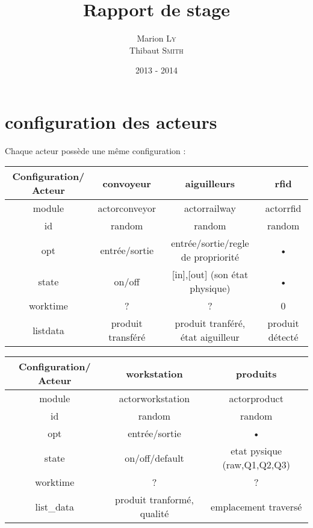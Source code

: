 

\newcommand\sectio[1]{%
  \section*{#1}%
  \addcontentsline{toc}{section}{#1}}

\renewcommand\contentsname{Sommaire}

\renewcommand{\thesection}{\arabic{section}}
\newcommand\familyname{\textsc}
\addto\captionsfrench{\renewcommand{\figurename}{Image}}

\newtoggle{annexes}
\toggletrue{annexes}



\title{\textbf{Rapport de stage}}
\author{Marion \familyname{Ly} \\ Thibaut \familyname{Smith}}
\date{2013 - 2014}


	\section{configuration des acteurs}
	
	Chaque acteur possède une même configuration :
	
	\begin{tabular}{|c|c|c|c|}
	\hline 
	Configuration/ Acteur & convoyeur & aiguilleurs & rfid  \\ 
	\hline 
	module & actorconveyor & actorrailway & actorrfid \\
	\hline 
	id & random & random & random \\
	\hline 
	opt & entrée/sortie & entrée/sortie/regle de propriorité & •  \\ 
	\hline 
	state & on/off & {[in],[out]} (son état physique) & • \\
	\hline 
	worktime & ? & ? & 0\\ 
	\hline 
	listdata & produit transféré & {produit tranféré, état aiguilleur} & produit détecté  \\ 
	\hline 
	\end{tabular} 
	
	
	\begin{tabular}{|c|c|c|}
	\hline
	Configuration/ Acteur & workstation & produits \\
	\hline
	module & actorworkstation & actorproduct \\ 
	\hline
	id & random & random \\ 
	\hline
	opt & entrée/sortie & •\\
	\hline
	state & on/off/default & etat pysique (raw,Q1,Q2,Q3) \\ 
	\hline
	worktime & ? & ?  \\
	\hline
	list\_data & {produit tranformé, qualité} & emplacement traversé\\
	\hline
	\end{tabular}
	
